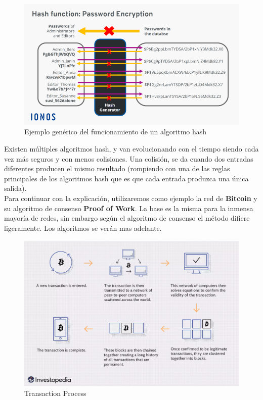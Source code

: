\begin{figure}[h!]
  \centering
  \includegraphics[width=0.6\linewidth]{figs/EstadoArte/Blockchain/hash}
  \caption[Hash]{Ejemplo genérico del funcionamiento de un algoritmo hash}
  \label{fig:hash}
\end{figure}

\clearpage

Existen múltiples algoritmos hash, y van evolucionando con el tiempo siendo cada vez más seguros y con menos colisiones. Una colisión, se da cuando dos entradas diferentes producen el mismo resultado (rompiendo con una de las reglas principales de los algoritmos hash que es que cada entrada produzca una única salida). \\

Para continuar con la explicación, utilizaremos como ejemplo la red de \textbf{Bitcoin}\cite{whatIsBitcoin} y su algoritmo de consenso \textbf{Proof of Work}\cite{whatIsProofOfWork}. La base es la misma para la inmensa mayoría de redes, sin embargo según el algoritmo de consenso el método difiere ligeramente. Los algoritmos se verán mas adelante. 

\begin{figure}[h!]
  \centering
  \includegraphics[width=0.8\linewidth]{figs/EstadoArte/Blockchain/bitcoinMining}
  \caption[Bitcoin Mining]{Transaction Process}
  \label{fig:bitcoin}
\end{figure}

